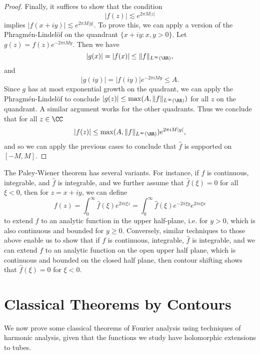 \begin{proof}
    Finally, it suffices to show that the condition
    \[ |f(z)| \lesssim e^{2\pi M |z|} \]
    implies $|f(x + iy)| \lesssim e^{2 \pi M |y|}$. To prove this, we can apply a version of the Phragm\'{e}n-Lindel\"{o}f on the quandrant $\{ x + iy: x, y > 0 \}$. Let $g(z) = f(z) e^{-2 \pi i M y}$. Then we have
    \[ |g(x)| = |f(x)| \leq \| f \|_{L^\infty(\RR)}, \]
    and
    \[ |g(iy)| = |f(iy)| e^{-2 \pi i M y} \leq A. \]
    Since $g$ has at most exponential growth on the quadrant, we can apply the Phragm\'{e}n-Lindel\"{o}f to conclude $|g(z)| \leq \max(A, \| f \|_{L^\infty(\RR)})$ for all $z$ on the quandrant. A similar argument works for the other quadrants. Thus we conclude that for all $z \in \CC$
    \[ |f(z)| \leq \max(A, \| f \|_{L^\infty(\RR)}) e^{2 \pi i M |y|}, \]
    and so we can apply the previous cases to conclude that $\widehat{f}$ is supported on $[-M,M]$.
\end{proof}

\begin{remark}
    The Paley-Wiener theorem has several variants. For instance, if $f$ is continuous, integrable, and $\widehat{f}$ is integrable, and we further assume that $\widehat{f}(\xi) = 0$ for all $\xi < 0$, then for $z = x + iy$, we can define
    \[ f(z) = \int_0^\infty \widehat{f}(\xi) e^{2 \pi i \xi z} = \int_0^\infty \widehat{f}(\xi) e^{- 2 \pi \xi y} e^{2 \pi i \xi x} \]
    to extend $f$ to an analytic function in the upper half-plane, i.e. for $y > 0$, which is also continuous and bounded for $y \geq0$. Conversely, similar techniques to those above enable us to show that if $f$ is continuous, integrable, $\widehat{f}$ is integrable, and we can extend $f$ to an analytic function on the open upper half plane, which is continuous and bounded on the closed half plane, then contour shifting shows that $\widehat{f}(\xi) = 0$ for $\xi < 0$.
\end{remark}

\section{Classical Theorems by Contours}

We now prove some classical theorems of Fourier analysis using techniques of harmonic analysis, given that the functions we study have holomorphic extensions to tubes.

